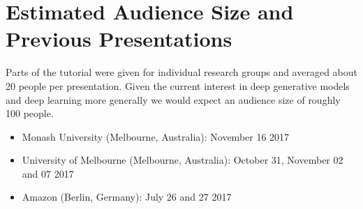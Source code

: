 \section{Estimated Audience Size and Previous Presentations}

Parts of the tutorial were given for individual research groups and averaged about 20 people per presentation. Given the current interest in deep generative models and deep learning more generally we 
would expect an audience size of roughly 100 people.

\begin{itemize}
	\item Monash University (Melbourne, Australia): November 16 2017
	\item University of Melbourne (Melbourne, Australia): October 31, November 02 and 07 2017
	\item Amazon (Berlin, Germany): July 26 and 27 2017
\end{itemize}
